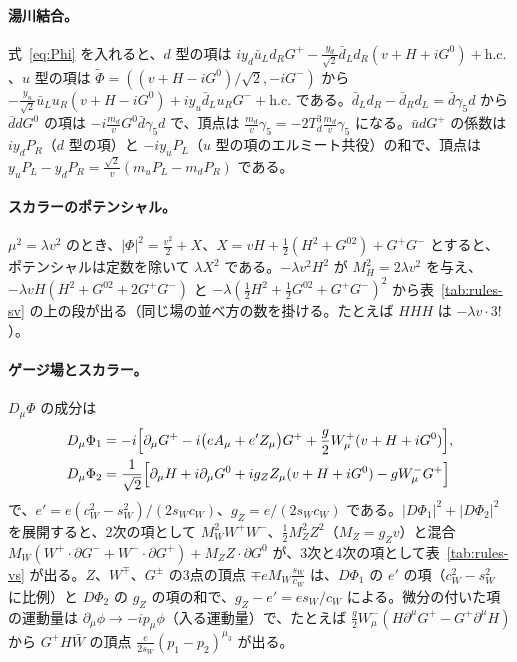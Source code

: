 \documentclass[a4paper,10pt]{ltjsarticle}
\newcommand{\sw}{s_W}
\newcommand{\cw}{c_W}
\begin{document}
\paragraph{湯川結合。}式~\eqref{eq:Phi} を入れると、$d$ 型の項は $iy_d\bar u_Ld_RG^+-\frac{y_d}{\sqrt2}\bar d_Ld_R(v+H+iG^0)+\mathrm{h.c.}$、$u$ 型の項は $\tilde\Phi=((v+H-iG^0)/\sqrt2,-iG^-)$ から $-\frac{y_u}{\sqrt2}\bar u_Lu_R(v+H-iG^0)+iy_u\bar d_Lu_RG^-+\mathrm{h.c.}$ である。$\bar d_Ld_R-\bar d_Rd_L=\bar d\gamma_5d$ から $\bar ddG^0$ の項は $-i\frac{m_d}vG^0\bar d\gamma_5d$ で、頂点は $\frac{m_d}v\gamma_5=-2T^3_d\frac{m_d}v\gamma_5$ になる。$\bar udG^+$ の係数は $iy_dP_R$（$d$ 型の項）と $-iy_uP_L$（$u$ 型の項のエルミート共役）の和で、頂点は $y_uP_L-y_dP_R=\frac{\sqrt2}v(m_uP_L-m_dP_R)$ である。

\paragraph{スカラーのポテンシャル。}$\mu^2=\lambda v^2$ のとき、$|\Phi|^2=\frac{v^2}2+X$、$X=vH+\frac12(H^2+G^{02})+G^+G^-$ とすると、ポテンシャルは定数を除いて $\lambda X^2$ である。$-\lambda v^2H^2$ が $M_H^2=2\lambda v^2$ を与え、$-\lambda v H(H^2+G^{02}+2G^+G^-)$ と $-\lambda(\frac12H^2+\frac12G^{02}+G^+G^-)^2$ から表~\ref{tab:rules-sv} の上の段が出る（同じ場の並べ方の数を掛ける。たとえば $HHH$ は $-\lambda v\cdot3!$）。

\paragraph{ゲージ場とスカラー。}$D_\mu\Phi$ の成分は
\begin{equation*}
\begin{aligned}
D_\mu\Phi_1&=-i\Bigl[\partial_\mu G^+-i\bigl(eA_\mu+e'Z_\mu\bigr)G^++\frac g2W^+_\mu(v+H+iG^0)\Bigr],\\
D_\mu\Phi_2&=\frac1{\sqrt2}\Bigl[\partial_\mu H+i\partial_\mu G^0+ig_ZZ_\mu(v+H+iG^0)-gW^-_\mu G^+\Bigr]
\end{aligned}
\end{equation*}
で、$e'=e(\cw^2-\sw^2)/(2\sw\cw)$、$g_Z=e/(2\sw\cw)$ である。$|D\Phi_1|^2+|D\Phi_2|^2$ を展開すると、2次の項として $M_W^2W^+W^-$、$\frac12M_Z^2Z^2$（$M_Z=g_Zv$）と混合 $M_W(W^+\cdot\partial G^-+W^-\cdot\partial G^+)+M_ZZ\cdot\partial G^0$ が、3次と4次の項として表~\ref{tab:rules-vs} が出る。$Z$、$W^\mp$、$G^\pm$ の3点の頂点 $\mp eM_W\frac{\sw}{\cw}$ は、$D\Phi_1$ の $e'$ の項（$\cw^2-\sw^2$ に比例）と $D\Phi_2$ の $g_Z$ の項の和で、$g_Z-e'=e\sw/\cw$ による。微分の付いた項の運動量は $\partial_\mu\phi\to-ip_\mu\phi$（入る運動量）で、たとえば $\frac g2W^-_\mu(H\partial^\mu G^+-G^+\partial^\mu H)$ から $G^+H\bar W$ の頂点 $\frac{e}{2\sw}(p_1-p_2)^{\mu_3}$ が出る。
\end{document}
